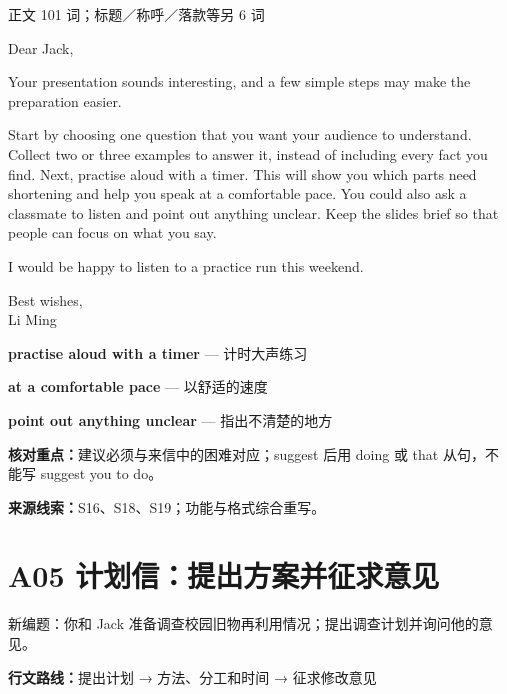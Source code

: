 \documentclass[11pt,a4paper,fontset=macnew]{ctexart}
\newenvironment{example}{\begingroup\fontsize{11}{14.3}\selectfont\setlength{\parskip}{4pt}}{\par\endgroup}
\begin{document}
{\small 正文 101 词；标题／称呼／落款等另 6 词}\par
\begin{example}
\noindent Dear Jack,\par
Your presentation sounds interesting, and a few simple steps may make the preparation easier.

Start by choosing one question that you want your audience to understand. Collect two or three examples to answer it, instead of including every fact you find. Next, practise aloud with a timer. This will show you which parts need shortening and help you speak at a comfortable pace. You could also ask a classmate to listen and point out anything unclear. Keep the slides brief so that people can focus on what you say.

I would be happy to listen to a practice run this weekend.

\noindent Best wishes,\\Li Ming\par
\end{example}
\par\vspace{4pt}{\bfseries 好词好句：优先记这三处}\par\nopagebreak
{\small\textbf{practise aloud with a timer} — 计时大声练习}\par
{\small\textbf{at a comfortable pace} — 以舒适的速度}\par
{\small\textbf{point out anything unclear} — 指出不清楚的地方}\par
{\small\textbf{核对重点：}建议必须与来信中的困难对应；suggest 后用 doing 或 that 从句，不能写 suggest you to do。}\par
{\fontsize{8}{10}\selectfont\textbf{来源线索：}S16、S18、S19；功能与格式综合重写。}\par
\clearpage\section*{A05  计划信：提出方案并征求意见}
{\small 新编题：你和 Jack 准备调查校园旧物再利用情况；提出调查计划并询问他的意见。}\par
{\small\textbf{行文路线：}提出计划 → 方法、分工和时间 → 征求修改意见}\par
\par\vspace{4pt}{\bfseries 可替换模板}\par\nopagebreak
\end{document}

